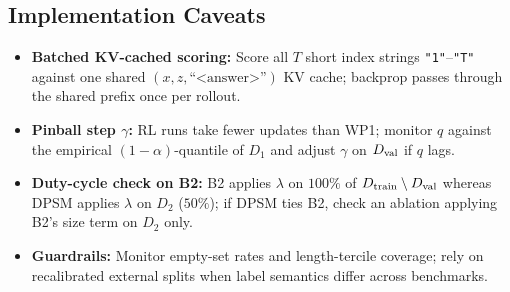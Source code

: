 \documentclass[10pt,a4paper]{article}
\begin{document}
\subsection{Implementation Caveats}
\begin{itemize}
\item \textbf{Batched KV-cached scoring:} Score all $T$ short index strings \texttt{"1"}--\texttt{"T"} against one shared $(x,z,\text{``<answer>''})$ KV cache; backprop passes through the shared prefix once per rollout.
\item \textbf{Pinball step $\gamma$:} RL runs take fewer updates than WP1; monitor $q$ against the empirical $(1-\alpha)$-quantile of $D_1$ and adjust $\gamma$ on $D_{\mathrm{val}}$ if $q$ lags.
\item \textbf{Duty-cycle check on B2:} B2 applies $\lambda$ on $100\%$ of $D_{\mathrm{train}}\setminus D_{\mathrm{val}}$ whereas DPSM applies $\lambda$ on $D_2$ ($50\%$); if DPSM ties B2, check an ablation applying B2's size term on $D_2$ only.
\item \textbf{Guardrails:} Monitor empty-set rates and length-tercile coverage; rely on recalibrated external splits when label semantics differ across benchmarks.
\end{itemize}
\end{document}
